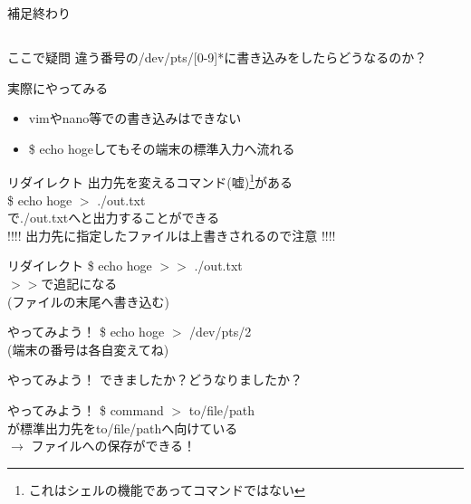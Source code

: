 \documentclass[uplatex, dvipdfmx, unicode]{beamer}
\begin{document}
\begin{frame}
  \centering
  補足終わり
\end{frame}

\subsection{}
\begin{frame}{ここで疑問}
  違う番号の/dev/pts/[0-9]*に書き込みをしたらどうなるのか？
\end{frame}

\begin{frame}{実際にやってみる}
  \begin{itemize}
    \item{vimやnano等での書き込みはできない}
    \item{\$ echo hogeしてもその端末の標準入力へ流れる}
  \end{itemize}
\end{frame}

\begin{frame}{リダイレクト}
  出力先を変えるコマンド(嘘)\footnote{これはシェルの機能であってコマンドではない}がある \\
  \$ echo hoge \alert{$>$ ./out.txt} \\
  で./out.txtへと出力することができる \\
  \vspace{.2in}
  \alert{!!!! 出力先に指定したファイルは上書きされるので注意 !!!!}
\end{frame}

\begin{frame}{リダイレクト}
  \$ echo hoge \alert{$>>$ ./out.txt} \\
  $>>$で追記になる \\
  (ファイルの末尾へ書き込む)
\end{frame}

\begin{frame}{やってみよう！}
  \$ echo hoge $>$ /dev/pts/2 \\
  (端末の番号は各自変えてね)
\end{frame}

\begin{frame}{やってみよう！}
  できましたか？どうなりましたか？\faHandPaperO
\end{frame}

\begin{frame}{やってみよう！}
  \$ command \alert{$>$ to/file/path} \\
  が標準出力先をto/file/pathへ向けている \\
  $\rightarrow$ ファイルへの保存ができる！ \\
  \vspace{.5cm}
\end{frame}
\end{document}
